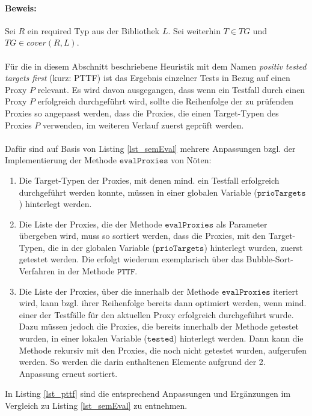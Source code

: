 \paragraph{Beweis:}
Sei $R$ ein required Typ aus der Bibliothek $L$. Sei weiterhin $T \in \mathit{TG}$ und $\mathit{TG} \in \mathit{cover(R,L)}$.
\\\\
Für die in diesem Abschnitt beschriebene Heuristik mit dem Namen \emph{positiv tested targets first} (kurz: PTTF) ist das Ergebnis einzelner Tests in Bezug auf einen Proxy $P$ relevant. Es wird davon ausgegangen, dass wenn ein Testfall durch einen Proxy $P$ erfolgreich durchgeführt wird, sollte die Reihenfolge der zu prüfenden Proxies so angepasst werden, dass die Proxies, die einen Target-Typen des Proxies $P$ verwenden, im weiteren Verlauf zuerst geprüft werden.
\\\\
Dafür sind auf Basis von Listing \ref{lst_semEval} mehrere Anpassungen bzgl. der Implementierung der Methode $\texttt{evalProxies}$ von Nöten:
\begin{enumerate}
\item Die Target-Typen der Proxies, mit denen mind. ein Testfall erfolgreich durchgeführt werden konnte, müssen in einer globalen Variable ($\texttt{prioTargets}$) hinterlegt werden.
\item Die Liste der Proxies, die der Methode $\texttt{evalProxies}$ als Parameter übergeben wird, muss so sortiert werden, dass die Proxies, mit den Target-Typen, die in der globalen Variable ($\texttt{prioTargets}$) hinterlegt wurden, zuerst getestet werden. Die erfolgt wiederum exemplarisch über das Bubble-Sort-Verfahren in der Methode $\texttt{PTTF}$.
\item Die Liste der Proxies, über die innerhalb der Methode $\texttt{evalProxies}$ iteriert wird, kann bzgl. ihrer Reihenfolge bereits dann optimiert werden, wenn mind. einer der Testfälle für den aktuellen Proxy erfolgreich durchgeführt wurde. Dazu müssen jedoch die Proxies, die bereits innerhalb der Methode getestet wurden, in einer lokalen Variable ($\texttt{tested}$) hinterlegt werden. Dann kann die Methode rekursiv mit den Proxies, die noch nicht getestet wurden, aufgerufen werden. So werden die darin enthaltenen Elemente aufgrund der 2. Anpassung erneut sortiert.
\end{enumerate}  
In Listing \ref{lst_pttf} sind die entsprechend Anpassungen und Ergänzungen im Vergleich zu Listing \ref{lst_semEval} zu entnehmen.
